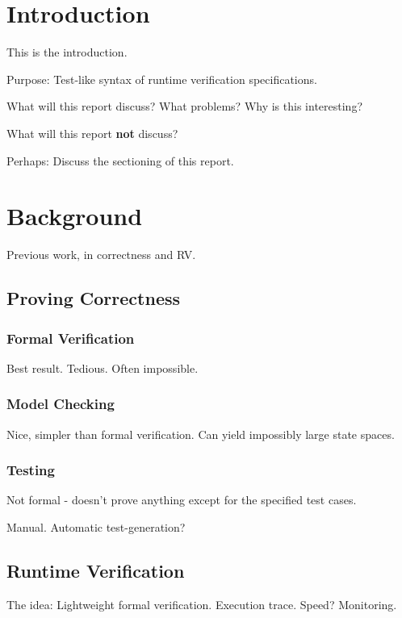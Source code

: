 \documentclass[a4paper,11pt]{kth-mag}
\begin{document}
\pagestyle{newchap}
\chapter{Introduction}

This is the introduction.

Purpose: Test-like syntax of runtime verification specifications.

What will this report discuss? What problems? Why is this interesting?

What will this report \textbf{not} discuss?

Perhaps: Discuss the sectioning of this report.

\pagestyle{newchap}
\chapter{Background}

Previous work, in correctness and RV.

\section{Proving Correctness}

\subsection{Formal Verification}

Best result. Tedious. Often impossible.

\subsection{Model Checking}

Nice, simpler than formal verification. Can yield impossibly large state spaces.

\subsection{Testing}

Not formal - doesn't prove anything except for the specified test cases.

Manual. Automatic test-generation?

\section{Runtime Verification}

The idea: Lightweight formal verification. Execution trace. Speed? Monitoring.
\end{document}
